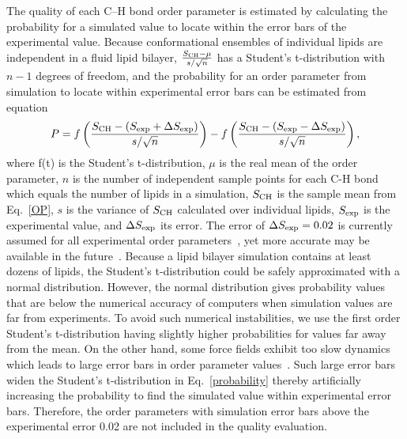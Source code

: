 \documentclass[fleqn,10pt]{wlscirep}
\begin{document}
The quality of each C--H bond order parameter is estimated by calculating the probability for a simulated value to locate within the error bars of the experimental value. Because conformational ensembles of individual lipids are independent in a fluid lipid bilayer, $\frac{S_{\rm CH}-\mu}{s/\sqrt{n}}$ has a Student's t-distribution with $n-1$ degrees of freedom, and the probability for an order parameter from simulation to locate within experimental error bars can be estimated from equation
\begin{equation}\label{probability}
  P = f \left( \frac{S_{\rm CH} - (S_{\rm exp}+\Delta S_{\rm exp})}{s/\sqrt{n}} \right) - f \left( \frac{S_{\rm CH} - (S_{\rm exp}-\Delta S_{\rm exp})}{s/\sqrt{n}} \right),
\end{equation}
where f(t) is the %
Student's t-distribution, $\mu$ is the real mean of the order parameter, $n$ is the number of independent sample points for each C-H bond which equals the number of lipids in a simulation, $S_{\rm CH}$ is the sample mean from Eq.~\ref{OP}, $s$ is the variance of $S_{\rm CH}$ calculated over individual lipids, $S_{\rm exp}$ is the experimental value, and $\Delta S_{\rm exp}$ its error. The error of $\Delta S_{\rm exp} = 0.02$ is currently assumed for all experimental order parameters~\cite{ollila16}, yet more accurate may be available in the future~\cite{wurl22}. Because a lipid bilayer simulation contains at least dozens of lipids, the Student's t-distribution could be safely approximated with a normal distribution. However, the normal distribution gives probability values that are below the numerical accuracy of computers when simulation values are far from experiments. To avoid such numerical instabilities, we use the first order Student's t-distribution having slightly higher probabilities for values far away from the mean.
On the other hand, some force fields exhibit too slow dynamics which leads to large error bars in order parameter values~\cite{antila21a}. Such large error bars widen the Student's t-distribution in Eq.~\ref{probability} thereby artificially increasing the probability to find the simulated value within experimental error bars. Therefore, the order parameters with simulation error bars above the experimental error 0.02 are not included in the quality evaluation.
\end{document}
